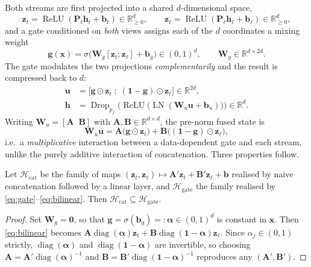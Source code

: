 Both streams are first projected into a shared $d$-dimensional space,
\begin{equation}
\mathbf{z}_t=\operatorname{ReLU}(\mathbf{P}_t\mathbf{h}_t+\mathbf{b}_t)\in\mathbb{R}_{\ge0}^{d},\qquad
\mathbf{z}_\ell=\operatorname{ReLU}(\mathbf{P}_\ell\mathbf{h}_\ell+\mathbf{b}_\ell)\in\mathbb{R}_{\ge0}^{d},
\end{equation}
and a gate conditioned on \emph{both} views assigns each of the $d$ coordinates a mixing weight
\begin{equation}
\boxed{\;\mathbf{g}(\mathbf{x})=\sigma\big(\mathbf{W}_g[\mathbf{z}_t;\mathbf{z}_\ell]+\mathbf{b}_g\big)\in(0,1)^{d},\qquad
\mathbf{W}_g\in\mathbb{R}^{d\times 2d}.\;}
\label{eq:gate}
\end{equation}
The gate modulates the two projections \emph{complementarily} and the result is compressed back to $d$:
\begin{align}
\mathbf{u}&=\big[\mathbf{g}\odot\mathbf{z}_t\;;\;(\mathbf{1}-\mathbf{g})\odot\mathbf{z}_\ell\big]\in\mathbb{R}^{2d},\label{eq:u}\\
\mathbf{h}&=\operatorname{Drop}_{p_f}\Big(\operatorname{ReLU}\big(\operatorname{LN}(\mathbf{W}_u\mathbf{u}+\mathbf{b}_u)\big)\Big)\in\mathbb{R}^{d}.\label{eq:fuse}
\end{align}
Writing $\mathbf{W}_u=[\mathbf{A}\;\;\mathbf{B}]$ with $\mathbf{A},\mathbf{B}\in\mathbb{R}^{d\times d}$, the pre-norm fused
state is
\begin{equation}
\mathbf{W}_u\mathbf{u}=\mathbf{A}\big(\mathbf{g}\odot\mathbf{z}_t\big)+\mathbf{B}\big((\mathbf{1}-\mathbf{g})\odot\mathbf{z}_\ell\big),
\label{eq:bilinear}
\end{equation}
i.e.\ a \emph{multiplicative} interaction between a data-dependent gate and each stream, unlike the purely
additive interaction of concatenation. Three properties follow.

\begin{proposition}
\label{prop:concat}
Let $\mathcal{H}_{\mathrm{cat}}$ be the family of maps $(\mathbf{z}_t,\mathbf{z}_\ell)\mapsto
\mathbf{A}'\mathbf{z}_t+\mathbf{B}'\mathbf{z}_\ell+\mathbf{b}$ realised by naive concatenation followed by a linear layer,
and $\mathcal{H}_{\mathrm{gate}}$ the family realised by \eqref{eq:gate}--\eqref{eq:bilinear}. Then
$\mathcal{H}_{\mathrm{cat}}\subseteq\mathcal{H}_{\mathrm{gate}}$.
\end{proposition}
\begin{proof}
Set $\mathbf{W}_g=\mathbf{0}$, so that $\mathbf{g}=\sigma(\mathbf{b}_g)=:\bm{\alpha}\in(0,1)^d$ is constant in
$\mathbf{x}$. Then \eqref{eq:bilinear} becomes
$\mathbf{A}\operatorname{diag}(\bm{\alpha})\mathbf{z}_t+\mathbf{B}\operatorname{diag}(\mathbf{1}-\bm{\alpha})\mathbf{z}_\ell$.
Since $\alpha_j\in(0,1)$ strictly, $\operatorname{diag}(\bm{\alpha})$ and
$\operatorname{diag}(\mathbf{1}-\bm{\alpha})$ are invertible, so choosing
$\mathbf{A}=\mathbf{A}'\operatorname{diag}(\bm{\alpha})^{-1}$ and
$\mathbf{B}=\mathbf{B}'\operatorname{diag}(\mathbf{1}-\bm{\alpha})^{-1}$ reproduces any
$(\mathbf{A}',\mathbf{B}')$.
\end{proof}

